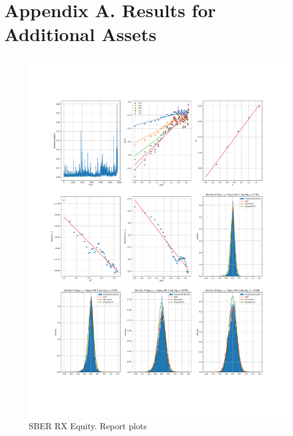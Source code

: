 \section{Appendix A. Results for Additional Assets}
    \noindent
    \begin{figure}[h]
        \centering
        \includegraphics[width=\textwidth]{fig/SBER RX Equity.pdf}
        \caption{SBER RX Equity. Report plots}
    \end{figure}


